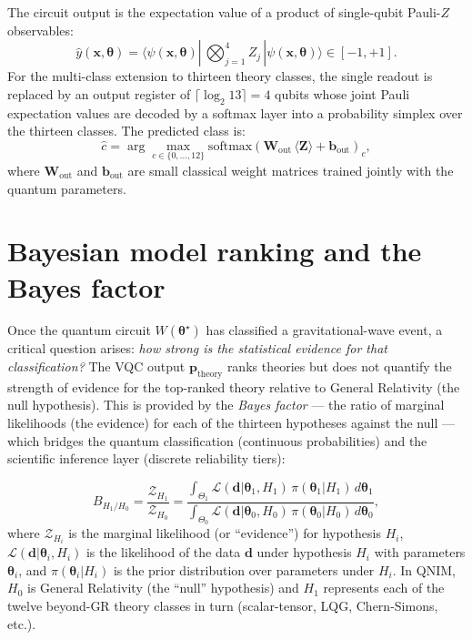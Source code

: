 \documentclass[11pt,a4paper, english]{book}
\theoremstyle{plain}
\theoremstyle{definition}
\numberwithin{equation}{chapter}
\numberwithin{figure}{chapter}
\numberwithin{table}{chapter}
\begin{document}
The circuit output is the expectation value of a product of single-qubit
Pauli-$Z$ observables:
\begin{equation}
  \label{eq:measurement}
  \hat{y}(\mathbf{x},\boldsymbol{\theta}) =
    \langle\psi(\mathbf{x},\boldsymbol{\theta})|\,
\bigotimes_{j=1}^{4} Z_j \,|
    \psi(\mathbf{x},\boldsymbol{\theta})\rangle
    \in [-1, +1].
\end{equation}
For the multi-class extension to thirteen theory classes, the single readout
is replaced by an output register of $\lceil\log_2 13\rceil = 4$ qubits
whose joint Pauli expectation values are decoded by a softmax layer into
a probability simplex over the thirteen classes.  The predicted
class is:
\begin{equation}
  \label{eq:predicted_class}
  \hat{c} = \arg\max_{c \in \{0,\ldots,12\}}
    \mathrm{softmax}\!\left(\mathbf{W}_\mathrm{out}\,
    \langle\boldsymbol{Z}\rangle + \mathbf{b}_\mathrm{out}\right)_c,
\end{equation}
where $\mathbf{W}_\mathrm{out}$ and $\mathbf{b}_\mathrm{out}$ are small
classical weight matrices trained jointly with the quantum parameters.

\section{Bayesian model ranking and the Bayes factor}
\label{sec:bayes-factor-formalism}

Once the quantum circuit $W(\boldsymbol{\theta}^\star)$ has classified a
gravitational-wave event, a critical question arises: \emph{how strong is
the statistical evidence for that classification?} The VQC output
$\mathbf{p}_\mathrm{theory}$ ranks theories but does not quantify the
strength of evidence for the top-ranked theory relative to General
Relativity (the null hypothesis). This is provided by the \emph{Bayes
factor} --- the ratio of marginal likelihoods (the evidence) for each of
the thirteen hypotheses against the null --- which bridges the quantum
classification (continuous probabilities) and the scientific inference
layer (discrete reliability tiers):

\begin{equation}
  \label{eq:bayes-factor-definition}
  B_{H_1/H_0} = \frac{\mathcal{Z}_{H_1}}{\mathcal{Z}_{H_0}} =
    \frac{\int_{\Theta_1} \mathcal{L}(\mathbf{d}|\boldsymbol{\theta}_1, H_1)\,\pi(\boldsymbol{\theta}_1|H_1)\,d\boldsymbol{\theta}_1}
    {\int_{\Theta_0} \mathcal{L}(\mathbf{d}|\boldsymbol{\theta}_0, H_0)\,\pi(\boldsymbol{\theta}_0|H_0)\,d\boldsymbol{\theta}_0},
\end{equation}
where $\mathcal{Z}_{H_i}$ is the marginal likelihood (or ``evidence'') for
hypothesis $H_i$, $\mathcal{L}(\mathbf{d}|\boldsymbol{\theta}_i, H_i)$ is the
likelihood of the data $\mathbf{d}$ under hypothesis $H_i$ with parameters
$\boldsymbol{\theta}_i$, and $\pi(\boldsymbol{\theta}_i|H_i)$ is the prior
distribution over parameters under $H_i$.  In QNIM, $H_0$ is General Relativity
(the ``null'' hypothesis) and $H_1$ represents each of the twelve beyond-GR
theory classes in turn (scalar-tensor, LQG, Chern-Simons, etc.).
\end{document}
